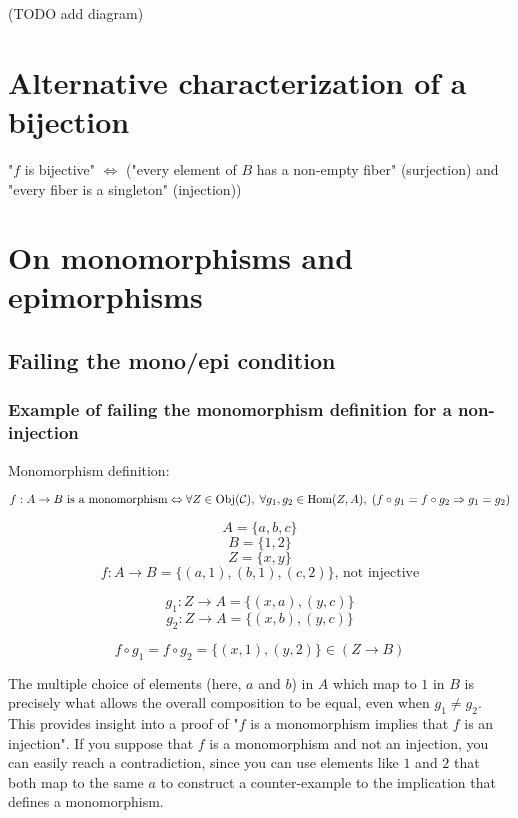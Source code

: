 \documentclass[12pt, letterpaper, twoside]{report}
\begin{document}
(TODO add diagram)






\section*{Alternative characterization of a bijection}
"$f$ is bijective" $\Leftrightarrow$ ("every element of $B$ has a non-empty fiber" (surjection) and "every fiber is a singleton" (injection))





\section*{On monomorphisms and epimorphisms}

\subsection*{Failing the mono/epi condition}


\subsubsection*{Example of failing the monomorphism definition for a non-injection}

Monomorphism definition:

$$
\text{$f : A \to B$ is a monomorphism}
\\ \Leftrightarrow \\
\forall Z \in \text{Obj}(\mathcal{C}), \;
\forall g_1, g_2 \in \text{Hom}(Z, A), \;
(f \circ g_1 = f \circ g_2 \Rightarrow g_1 = g_2)
$$



$$A = \{ a, b, c \}$$
$$B = \{ 1, 2    \}$$
$$Z = \{ x, y    \}$$
$$f : A \to B = \{ (a, 1), (b, 1), (c, 2) \} \text{, not injective}$$

$$g_1 : Z \to A = \{ (x, a), (y, c) \}$$
$$g_2 : Z \to A = \{ (x, b), (y, c) \}$$

$$f \circ g_1 = f \circ g_2 = \{(x, 1), (y, 2)\} \in (Z \to B)$$

The multiple choice of elements (here, $a$ and $b$) in $A$ which map to $1$ in $B$ is precisely what allows the overall composition to be equal, even when $g_1 \neq g_2$. This provides insight into a proof of "$f$ is a monomorphism implies that $f$ is an injection". If you suppose that $f$ is a monomorphism and not an injection, you can easily reach a contradiction, since you can use elements like $1$ and $2$ that both map to the same $a$ to construct a counter-example to the implication that defines a monomorphism.
\end{document}
